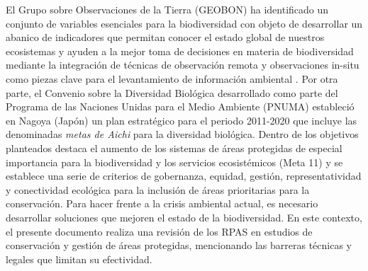 \documentclass[twocolumn]{extarticle}
\begin{document}
El Grupo sobre Observaciones de la Tierra (GEOBON) ha identificado un
conjunto de variables esenciales para la biodiversidad
\citep{Pereira2013} con objeto de desarrollar un abanico de indicadores
que permitan conocer el estado global de nuestros ecosistemas y ayuden a
la mejor toma de decisiones en materia de biodiversidad mediante la
integración de técnicas de observación remota y observaciones in-situ
como piezas clave para el levantamiento de información ambiental
\citep{Forum2008}. Por otra parte, el Convenio sobre la Diversidad
Biológica desarrollado como parte del Programa de las Naciones Unidas
para el Medio Ambiente (PNUMA) estableció en Nagoya (Japón) un plan
estratégico para el periodo 2011-2020 que incluye las denominadas
\emph{metas de Aichi} para la diversidad biológica. Dentro de los
objetivos planteados destaca el aumento de los sistemas de áreas
protegidas de especial importancia para la biodiversidad y los servicios
ecosistémicos (Meta 11) y se establece una serie de criterios de
gobernanza, equidad, gestión, representatividad y conectividad ecológica
para la inclusión de áreas prioritarias para la conservación. Para hacer
frente a la crisis ambiental actual, es necesario desarrollar soluciones
que mejoren el estado de la biodiversidad. En este contexto, el presente
documento realiza una revisión de los RPAS en estudios de conservación y
gestión de áreas protegidas, mencionando las barreras técnicas y legales
que limitan su efectividad.
\end{document}
